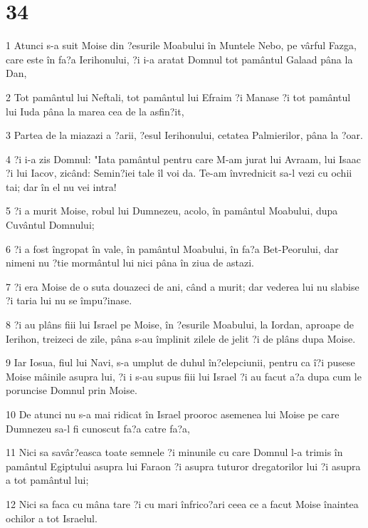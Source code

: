 \chapter{34}

\par 1 Atunci s-a suit Moise din ?esurile Moabului în Muntele Nebo, pe vârful Fazga, care este în fa?a Ierihonului, ?i i-a aratat Domnul tot pamântul Galaad pâna la Dan,
\par 2 Tot pamântul lui Neftali, tot pamântul lui Efraim ?i Manase ?i tot pamântul lui Iuda pâna la marea cea de la asfin?it,
\par 3 Partea de la miazazi a ?arii, ?esul Ierihonului, cetatea Palmierilor, pâna la ?oar.
\par 4 ?i i-a zis Domnul: "Iata pamântul pentru care M-am jurat lui Avraam, lui Isaac ?i lui Iacov, zicând: Semin?iei tale îl voi da. Te-am învrednicit sa-l vezi cu ochii tai; dar în el nu vei intra!
\par 5 ?i a murit Moise, robul lui Dumnezeu, acolo, în pamântul Moabului, dupa Cuvântul Domnului;
\par 6 ?i a fost îngropat în vale, în pamântul Moabului, în fa?a Bet-Peorului, dar nimeni nu ?tie mormântul lui nici pâna în ziua de astazi.
\par 7 ?i era Moise de o suta douazeci de ani, când a murit; dar vederea lui nu slabise ?i taria lui nu se împu?inase.
\par 8 ?i au plâns fiii lui Israel pe Moise, în ?esurile Moabului, la Iordan, aproape de Ierihon, treizeci de zile, pâna s-au împlinit zilele de jelit ?i de plâns dupa Moise.
\par 9 Iar Iosua, fiul lui Navi, s-a umplut de duhul în?elepciunii, pentru ca î?i pusese Moise mâinile asupra lui, ?i i s-au supus fiii lui Israel ?i au facut a?a dupa cum le poruncise Domnul prin Moise.
\par 10 De atunci nu s-a mai ridicat în Israel prooroc asemenea lui Moise pe care Dumnezeu sa-l fi cunoscut fa?a catre fa?a,
\par 11 Nici sa savâr?easca toate semnele ?i minunile cu care Domnul l-a trimis în pamântul Egiptului asupra lui Faraon ?i asupra tuturor dregatorilor lui ?i asupra a tot pamântul lui;
\par 12 Nici sa faca cu mâna tare ?i cu mari înfrico?ari ceea ce a facut Moise înaintea ochilor a tot Israelul.


